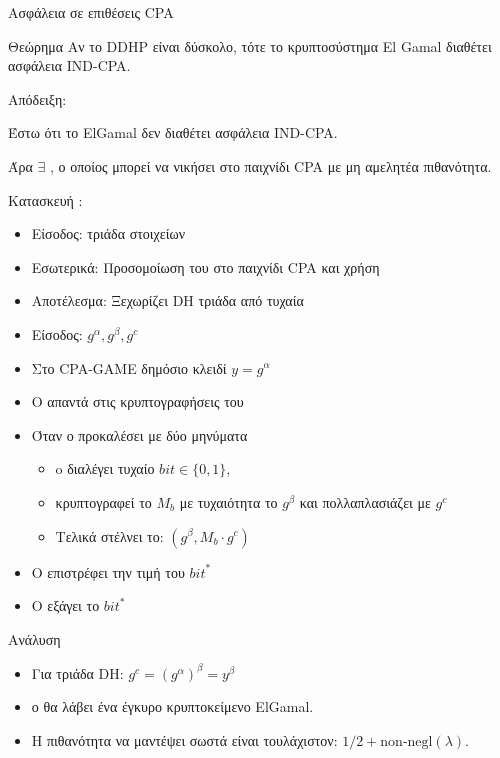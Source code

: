 \documentclass[handout]{beamer}
\begin{document}
\begin{frame}[allowframebreaks]{Ασφάλεια σε επιθέσεις CPA}
\begin{block}{Θεώρημα}
Αν το DDHP είναι δύσκολο, τότε το κρυπτοσύστημα El Gamal διαθέτει ασφάλεια IND-CPA.
\end{block}

Απόδειξη:

Έστω ότι το ElGamal δεν διαθέτει ασφάλεια IND-CPA. 

Άρα $\exists$ \adv, ο οποίος μπορεί να νικήσει στο παιχνίδι CPA με μη αμελητέα πιθανότητα. 

Κατασκευή \advb:
\begin{itemize}
\item Είσοδος: τριάδα στοιχείων
\item Εσωτερικά: Προσομοίωση του \chal στο παιχνίδι CPA και χρήση \adv 
\item Αποτέλεσμα: Ξεχωρίζει DH τριάδα από τυχαία 
\end{itemize}
 


\begin{itemize}
\item Είσοδος: $g^\alpha,g^\beta, g^c$
\item Στο CPA-GAME δημόσιο κλειδί $y =  g^\alpha$ 
\item Ο \advb απαντά στις κρυπτογραφήσεις του \adv
\item Όταν ο \adv προκαλέσει με δύο μηνύματα 
\begin{itemize}
\item o \chal διαλέγει τυχαίο $bit \in \{0, 1\}$,
\item κρυπτογραφεί το $M_b$ με τυχαιότητα το $g^\beta$ και πολλαπλασιάζει με $g^{c}$
\item Τελικά στέλνει το:  $( g^\beta  , M_b \cdot g^{c}  )$
\end{itemize}
\item O \adv επιστρέφει την τιμή του ${bit}^*$
\item Ο \advb εξάγει το ${bit}^*$
\end{itemize}



\begin{block}{Ανάλυση}
\begin{itemize}

\item Για τριάδα DH: $g^c = (g^\alpha)^\beta = y^\beta $ 
\item ο \adv θα λάβει ένα έγκυρο κρυπτοκείμενο ElGamal.
\item H πιθανότητα να μαντέψει σωστά είναι τουλάχιστον: ${1}/{2} + \text{non-negl}(\lambda)$.


\end{itemize}
\end{block}
\end{frame}
\end{document}
